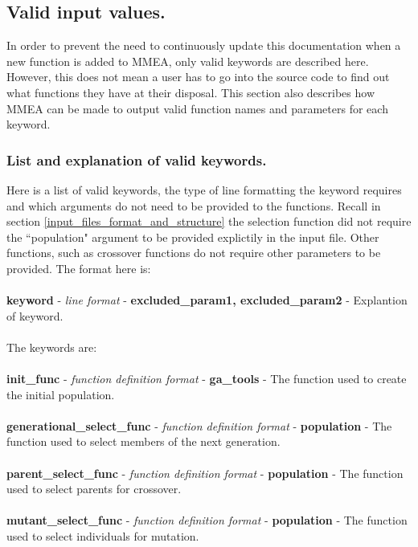 \documentclass[12pt]{article}
\begin{document}
\subsection{Valid input values.}
\label{input_files_valid_parameters}
In order to prevent the need to continuously update this documentation when a new function is added to MMEA, only valid keywords are described here. However, this does not mean a user has to go into the source code to find out what functions they have at their disposal. This section also describes how MMEA can be made to output valid function names and parameters for each keyword.
\subsubsection{List and explanation of valid keywords.}
\label{list and explanation of valid keywords.}
Here is a list of valid keywords, the type of line formatting the keyword requires and which arguments do not need to be provided to the functions. Recall in section \ref{input_files_format_and_structure} the selection function did not require the ``population" argument to be provided explictily in the input file. Other functions, such as crossover functions do not require other parameters to be provided. The format here is:
\\
\\
\textbf{keyword} - \textit{line format} - \textbf{excluded\_param1, excluded\_param2} - Explantion of keyword.
\\
\\
The keywords are:
\\
\\
\textbf{init\_func} - \textit{function definition format} - \textbf{ga\_tools} - The function used to create the initial population.
\\
\\
\textbf{generational\_select\_func} - \textit{function definition format} - \textbf{population} - The function used to select members of the next generation.
\\
\\
\textbf{parent\_select\_func} - \textit{function definition format} - \textbf{population} - The function used to select parents for crossover.
\\
\\
\textbf{mutant\_select\_func} - \textit{function definition format} - \textbf{population} - The function used to select individuals for mutation.
\\
\\
\end{document}
